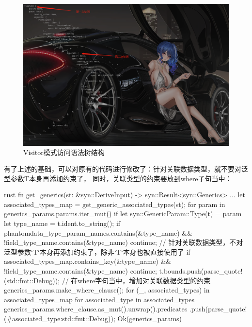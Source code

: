 \begin{figure}[H]
  \centering
  \includegraphics[width=\linewidth]{rust_syn_visitor.png}
  \caption{Visitor模式访问语法树结构}
  \label{fig:rust_syn_visitor}
\end{figure}

有了上述的基础，可以对原有的代码进行修改了：针对关联数据类型，就不要对泛型参数T本身再添加约束了，
同时，关联类型的约束要放到where子句当中：
\begin{code-block}{rust}
fn get_generics(st: &syn::DeriveInput) -> syn::Result<syn::Generics> {
    ...
    let associated_types_map = get_generic_associated_types(st);
    for param in generics_params.params.iter_mut() {
        if let syn::GenericParam::Type(t) = param {
            let type_name = t.ident.to_string();
            if phantomdata_type_param_names.contains(&type_name)
                && !field_type_name.contains(&type_name)
            {
                continue;
            }
            // 针对关联数据类型，不对泛型参数`T`本身再添加约束了，除非`T`本身也被直接使用了
            if associated_types_map.contains_key(&type_name)
                && !field_type_name.contains(&type_name)
            {
                continue;
            }
            t.bounds.push(parse_quote!(std::fmt::Debug));
        }
    }
    // 在where字句当中，增加对关联数据类型的约束
    generics_params.make_where_clause();
    for (_, associated_types) in associated_types_map {
        for associated_type in associated_types {
            generics_params.where_clause.as_mut().unwrap().predicates
                .push(parse_quote!(#associated_type:std::fmt::Debug));
        }
    }
    Ok(generics_params)
}
\end{code-block}

